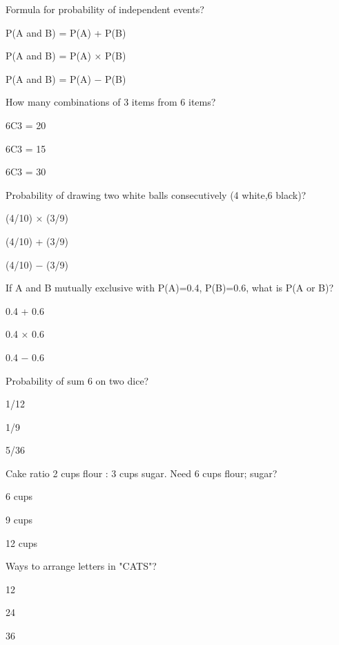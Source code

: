 \begin{enhancedmcq}{Formula for probability of independent events?}
\item P(A and B) = P(A) + P(B)
\item P(A and B) = P(A) × P(B)
\item P(A and B) = P(A) − P(B)

\end{enhancedmcq}
\begin{enhancedmcq}{How many combinations of 3 items from 6 items?}
\item 6C3 = 20
\item 6C3 = 15
\item 6C3 = 30

\end{enhancedmcq}
\begin{enhancedmcq}{Probability of drawing two white balls consecutively (4 white,6 black)?}
\item (4/10) × (3/9)
\item (4/10) + (3/9)
\item (4/10) − (3/9)

\end{enhancedmcq}
\begin{enhancedmcq}{If A and B mutually exclusive with P(A)=0.4, P(B)=0.6, what is P(A or B)?}
\item 0.4 + 0.6
\item 0.4 × 0.6
\item 0.4 − 0.6

\end{enhancedmcq}
\begin{enhancedmcq}{Probability of sum 6 on two dice?}
\item 1/12
\item 1/9
\item 5/36

\end{enhancedmcq}
\begin{enhancedmcq}{Cake ratio 2 cups flour : 3 cups sugar. Need 6 cups flour; sugar?}
\item 6 cups
\item 9 cups
\item 12 cups

\end{enhancedmcq}
\begin{enhancedmcq}{Ways to arrange letters in "CATS"?}
\item 12
\item 24
\item 36

\end{enhancedmcq}
